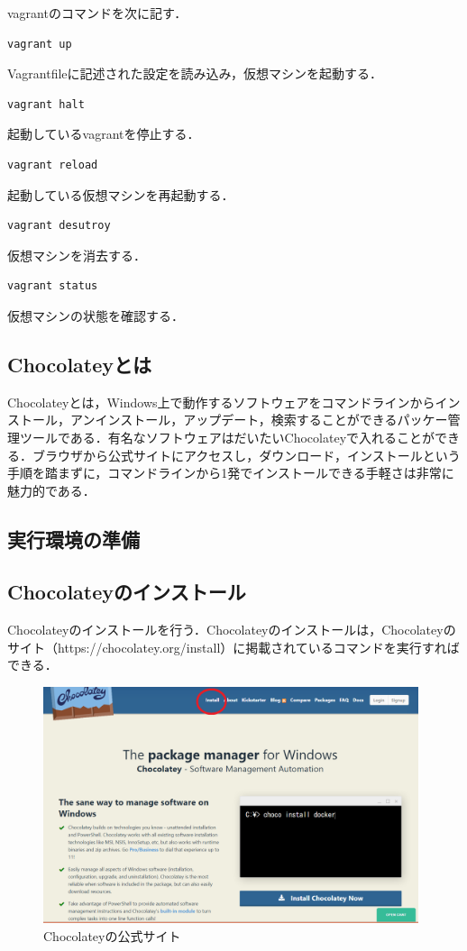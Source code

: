 vagrantのコマンドを次に記す．

{
\small
\begin{verbatim}
vagrant up
\end{verbatim}
}
Vagrantfileに記述された設定を読み込み，仮想マシンを起動する．

{
\small
\begin{verbatim}
vagrant halt
\end{verbatim}
}
起動しているvagrantを停止する．

{
\small
\begin{verbatim}
vagrant reload
\end{verbatim}
}
起動している仮想マシンを再起動する．

{
\small
\begin{verbatim}
vagrant desutroy
\end{verbatim}
}
仮想マシンを消去する．

{
\small
\begin{verbatim}
vagrant status
\end{verbatim}
}
仮想マシンの状態を確認する．

\subsection{Chocolateyとは}
Chocolateyとは，Windows上で動作するソフトウェアをコマンドラインからインストール，アンインストール，アップデート，検索することができるパッケー管理ツールである．有名なソフトウェアはだいたいChocolateyで入れることができる．ブラウザから公式サイトにアクセスし，ダウンロード，インストールという手順を踏まずに，コマンドラインから1発でインストールできる手軽さは非常に魅力的である．

\newpage

\subsection{実行環境の準備}
\subsection{Chocolateyのインストール}
Chocolateyのインストールを行う．Chocolateyのインストールは，Chocolateyのサイト（https://chocolatey.org/install）に掲載されているコマンドを実行すればできる．

\begin{figure}[h]
\centering
\includegraphics[width=11cm]{choco1.png}
\caption{Chocolateyの公式サイト}
\end{figure}

